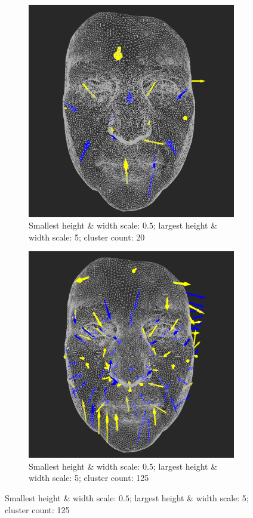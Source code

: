 \begin{figure}[h]
\centering
	\begin{subfigure}{0.3\textwidth}
	\includegraphics[width=\textwidth]{./img/meshdiff-arrows-interval0_5-5-count20-single.png}
    \caption{Smallest height \& width scale: \(0.5\); largest height \& width scale: 5; cluster count: 20}
    \label{fig:meshdiff_arrows_5-20}
	\end{subfigure}
    \qquad
    \begin{subfigure}{0.3\textwidth}
	\includegraphics[width=\textwidth]{./img/meshdiff-arrows-interval0_5-5-count125-single.png}
    \caption{Smallest height \& width scale: \(0.5\); largest height \& width scale: 5; cluster count: 125}
    \label{fig:meshdiff_arrows_5-125}
	\end{subfigure}
    

\end{figure}
